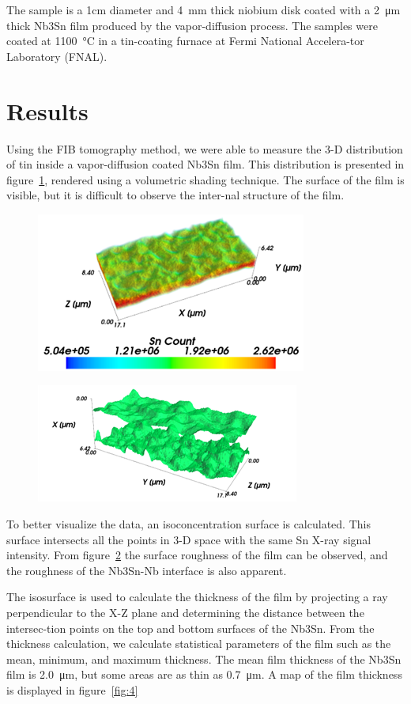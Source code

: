 The sample is a 1cm diameter and \qty{4}{\milli\meter} thick niobium disk coated with a \qty{2}{\micro\meter} thick Nb3Sn film produced by the vapor-diffusion process\cite{pudasaini2019growth}. The samples were coated at \qty{1100}{\celsius} in a tin-coating furnace at Fermi National Accelera-tor Laboratory (FNAL). 

\section{Results}

Using the FIB tomography method, we were able to measure the 3-D distribution of tin inside a vapor-diffusion coated Nb3Sn film. This distribution is presented in figure~\ref{fig:2}, rendered using a volumetric shading technique. The surface of the film is visible, but it is difficult to observe the inter-nal structure of the film.
 
\begin{figure}[htb]%
    \centering%
    \includegraphics[width=0.5\columnwidth]{../figs/Figure-2.png}%
    \caption{}%
    \label{fig:2}%
\end{figure}

\begin{figure}[htb]%
    \centering%
    \includegraphics[width=0.5\columnwidth]{../figs/Figure-3.png}%
    \caption{}%
    \label{fig:3}%
\end{figure}

To better visualize the data, an isoconcentration surface is calculated. This surface intersects all the points in 3-D space with the same Sn X-ray signal intensity. From figure~\ref{fig:3} the surface roughness of the film can be observed, and the roughness of the Nb3Sn-Nb interface is also apparent.
 
The isosurface is used to calculate the thickness of the film by projecting a ray perpendicular to the X-Z plane and determining the distance between the intersec-tion points on the top and bottom surfaces of the Nb3Sn. From the thickness calculation, we calculate statistical parameters of the film such as the mean, minimum, and maximum thickness. The mean film thickness of the Nb3Sn film is \qty{2.0}{\micro\meter}, but some areas are as thin as \qty{0.7}{\micro\meter}. A map of the film thickness is displayed in figure~\ref{fig:4}

